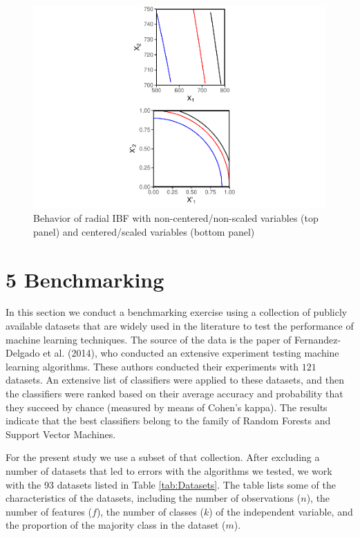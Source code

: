 \documentclass[]{elsarticle} %
\makeatletter
\def\maxwidth{\ifdim\Gin@nat@width>\linewidth\linewidth
\else\Gin@nat@width\fi}
\let\Oldincludegraphics\includegraphics
\renewcommand{\includegraphics}[1]{\Oldincludegraphics[width=\maxwidth]{#1}}
\makeatother
\begin{document}
\begin{figure}
\centering
\includegraphics{Trees_with_Base_Functions_v2_files/figure-latex/fig7-curvature-1.pdf}
\caption{\label{fig:fig7-curvature}Behavior of radial IBF with
non-centered/non-scaled variables (top panel) and centered/scaled
variables (bottom panel)}
\end{figure}

\section{5 Benchmarking}\label{benchmarking}

In this section we conduct a benchmarking exercise using a collection of
publicly available datasets that are widely used in the literature to
test the performance of machine learning techniques. The source of the
data is the paper of Fernandez-Delgado et al. (2014), who conducted an
extensive experiment testing machine learning algorithms. These authors
conducted their experiments with \(121\) datasets. An extensive list of
classifiers were applied to these datasets, and then the classifiers
were ranked based on their average accuracy and probability that they
succeed by chance (measured by means of Cohen's kappa). The results
indicate that the best classifiers belong to the family of Random
Forests and Support Vector Machines.

For the present study we use a subset of that collection. After
excluding a number of datasets that led to errors with the algorithms we
tested, we work with the 93 datasets listed in Table \ref{tab:Datasets}.
The table lists some of the characteristics of the datasets, including
the number of observations (\(n\)), the number of features (\(f\)), the
number of classes (\(k\)) of the independent variable, and the
proportion of the majority class in the dataset (\(m\)).
\end{document}
